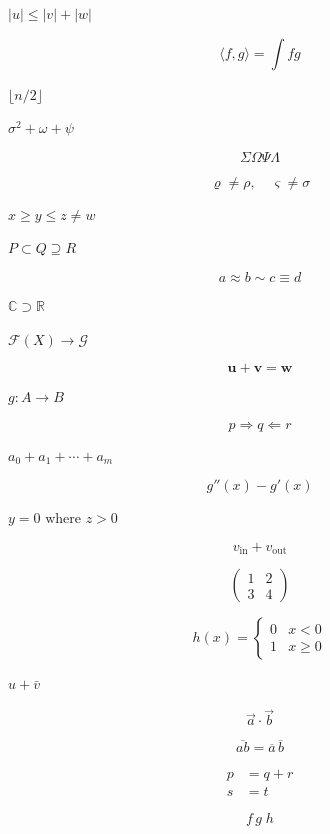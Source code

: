 \documentclass{article}
\begin{document}
\newpage
$
|u| \le |v| + |w|
$
\par
\newpage
\[
\langle f, g \rangle = \int f g
\]
\par
\newpage
$
\lfloor n/2 \rfloor
$
\par
\newpage
$
\sigma^2 + \omega + \psi
$
\par
\newpage
\[
\Sigma \Omega \Psi \Lambda
\]
\par
\newpage
\[
\varrho \ne \rho, \quad \varsigma \ne \sigma
\]
\par
\newpage
$
x \ge y \le z \neq w
$
\par
\newpage
$
P \subset Q \supseteq R
$
\par
\newpage
\[
a \approx b \sim c \equiv d
\]
\par
\newpage
$
\mathbb{C} \supset \mathbb{R}
$
\par
\newpage
$
\mathcal{F}(X) \to \mathcal{G}
$
\par
\newpage
\[
\mathbf{u} + \mathbf{v} = \mathbf{w}
\]
\par
\newpage
$
g \colon A \to B
$
\par
\newpage
\[
p \Rightarrow q \Leftarrow r
\]
\par
\newpage
$
a_0 + a_1 + \cdots + a_m
$
\par
\newpage
\[
g''(x) - g'(x)
\]
\par
\newpage
$
y = 0 \text{ where } z > 0
$
\par
\newpage
\[
v_{\text{in}} + v_{\text{out}}
\]
\par
\newpage
\[
\begin{pmatrix} 1 & 2 \\ 3 & 4 \end{pmatrix}
\]
\par
\newpage
\[
h(x) = \begin{cases} 0 & x < 0 \\ 1 & x \ge 0 \end{cases}
\]
\par
\newpage
$
\hat{u} + \bar{v}
$
\par
\newpage
\[
\vec{a} \cdot \vec{b}
\]
\par
\newpage
\[
\overline{a b} = \overline{a}\,\overline{b}
\]
\par
\newpage
\begin{align*}
p &= q + r \\ s &= t
\end{align*}
\par
\newpage
\[
f\,g\;h
\]
\par
\end{document}
